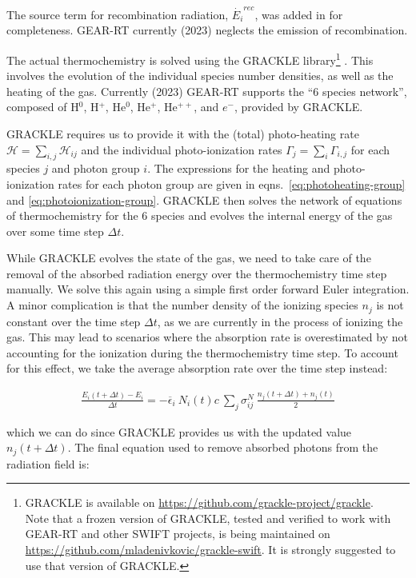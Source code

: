 The source term for recombination radiation, $\dot{E_i}^{rec}$, was added in for completeness.
GEAR-RT currently (2023) neglects the emission of recombination.

The actual thermochemistry is solved using the GRACKLE library\footnote{
GRACKLE is available on \url{https://github.com/grackle-project/grackle}.\\
Note that a frozen version of GRACKLE, tested and verified to work with GEAR-RT and other SWIFT
projects, is being maintained on \url{https://github.com/mladenivkovic/grackle-swift}. It is
strongly suggested to use that version of GRACKLE.
}
\citep{smithGrackleChemistryCooling2017}. This involves the evolution of the individual species
number densities, as well as the heating of the gas. Currently (2023) GEAR-RT supports the ``6
species network'', composed of H$^0$, H$^+$, He$^0$, He$^+$, He$^{++}$, and $e^{-}$, provided by
GRACKLE.

GRACKLE requires us to provide it with the (total) photo-heating rate $\mathcal{H} =
\sum_{i,j} \mathcal{H}_{ij}$ and the individual photo-ionization rates $\Gamma_{j} = \sum_i
\Gamma_{i,j}$ for each species $j$ and photon group $i$. The expressions for the heating and
photo-ionization rates for each photon group are given in eqns.~\ref{eq:photoheating-group} and
\ref{eq:photoionization-group}. GRACKLE then solves the network of equations of thermochemistry for the
6 species and evolves the internal energy of the gas over some time step
$\Delta t$.

While GRACKLE evolves the state of the gas, we need to take care of the removal of the absorbed
radiation energy over the thermochemistry time step manually. We solve this again using a simple
first order forward Euler integration. A minor complication is that the number density of the
ionizing species $n_j$ is not constant over the time step $\Delta t$, as we are currently in the
process of ionizing the gas. This may lead to scenarios where the absorption rate is overestimated
by not accounting for the ionization during the thermochemistry time step. To account for this
effect, we take the average absorption rate over the time step instead:


\begin{align*}
    \frac{E_i (t + \Delta t) - E_i}{\Delta t}
        = -\overline{\epsilon}_i \ N_i(t) c \ \sum_j \sigma_{i j} ^ N  \
    \frac{n_j(t + \Delta t) + n_j(t)}{2}
\end{align*}

which we can do since GRACKLE provides us with the updated value $n_j(t + \Delta t)$.
The final equation used to remove absorbed photons from the radiation field is:


